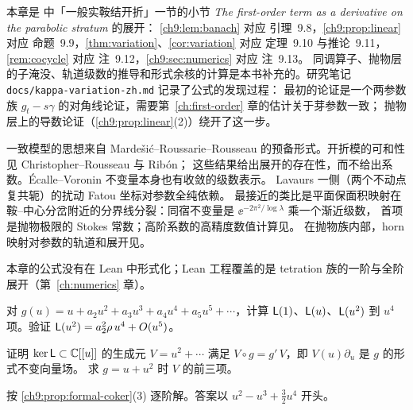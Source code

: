 \notes

本章是 \cite{KneserPaper} 中「一般实鞍结开折」一节的小节 \emph{The first-order term as a derivative on the parabolic stratum} 的展开：
\cref{ch9:lem:banach} 对应 引理~9.8，\cref{ch9:prop:linear} 对应 命题~9.9，\cref{thm:variation}、\cref{cor:variation} 对应 定理~9.10 与推论~9.11，
\cref{rem:cocycle} 对应 注~9.12，\cref{ch9:sec:numerics} 对应 注~9.13。
同调算子、抛物层的子淹没、轨道级数的推导和形式余核的计算是本书补充的。研究笔记 \texttt{docs/kappa-variation-zh.md} 记录了公式的发现过程：
最初的论证是一个两参数族 $g_t-s\gamma$ 的对角线论证，需要第~\ref{ch:first-order} 章的估计关于芽参数一致；
抛物层上的导数论证（\cref{ch9:prop:linear}(2)）绕开了这一步。

一致模型的思想来自 Marde\v{s}i\'c--Roussarie--Rousseau 的预备形式\cite{MRR2004}。开折模的可和性见 Christopher--Rousseau\cite{ChristopherRousseau} 与 Rib\'on\cite{Ribon2010}；
这些结果给出展开的存在性，而不给出系数。\'Ecalle--Voronin 不变量本身也有收敛的级数表示\cite{DudkoSauzin2014}。
Lavaurs 一侧（两个不动点复共轭）的扰动 Fatou 坐标对参数全纯依赖\cite{Shishikura2000,InouShishikura}。
最接近的类比是平面保面积映射在鞍--中心分岔附近的分界线分裂：同宿不变量是 $\ee^{-2\pi^2/\log\lambda}$ 乘一个渐近级数，
首项是抛物极限的 Stokes 常数\cite{GelfreichBrannstrom,GelfreichSauzin2001}；高阶系数的高精度数值计算见\cite{GelfreichSimo2008}。
在抛物族内部，horn 映射对参数的轨道和展开见\cite[Prop.~9.1]{BuffEcalleEpstein2013}。

本章的公式没有在 Lean 中形式化；Lean 工程覆盖的是 tetration 族的一阶与全阶展开（第~\ref{ch:numerics} 章）。

\exercises

\begin{exercise}\label{ch9:ex:L-coefficients}
对 $g(u)=u+a_2u^2+a_3u^3+a_4u^4+a_5u^5+\cdots$，计算 $\mathsf L(1)$、$\mathsf L(u)$、$\mathsf L(u^2)$ 到 $u^4$ 项。验证 $\mathsf L(u^2)=a_2^2\rho\,u^4+O(u^5)$。
\end{exercise}

\begin{exercise}\label{ch9:ex:kernel}
证明 $\ker\mathsf L\subset\mathbb{C}[[u]]$ 的生成元 $V=u^2+\cdots$ 满足 $V\circ g=g'\,V$，即 $V(u)\partial_u$ 是 $g$ 的形式不变向量场。
求 $g=u+u^2$ 时 $V$ 的前三项。
\begin{hint}按 \cref{ch9:prop:formal-coker}(3) 逐阶解。答案以 $u^2-u^3+\tfrac32u^4$ 开头。\end{hint}
\end{exercise}

